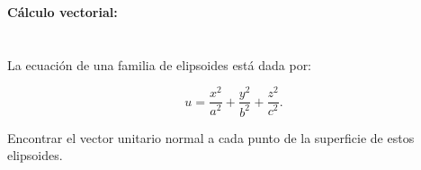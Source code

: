 \documentclass[./../main.tex]{subfiles}
\begin{document}
    {\LARGE\textbf{Cálculo vectorial:}\vspace*{-1.5em}}
    \section{}
    La ecuación de una familia de elipsoides está dada por:

    \begin{equation*}
        u = \dfrac{x^{2}}{a^{2}} + \dfrac{y^{2}}{b^{2}} + \dfrac{z^{2}}{c^{2}}.
    \end{equation*}

    Encontrar el vector unitario normal a cada punto de la superficie de estos elipsoides.
\end{document}
